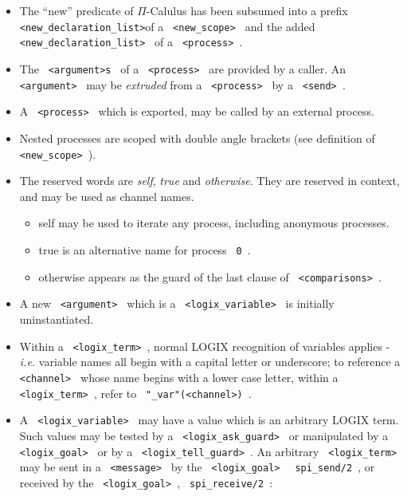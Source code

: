 \begin{itemize}

\item
The ``new'' predicate of $\Pi$-Calulus has been subsumed into a prefix
\verb+ <new_declaration_list>+\linebreak of a \verb+ <new_scope> +
and the added
\verb+ <new_declaration_list> + of a \verb+ <process> +.

\item
The \verb+ <argument>s + of a
\verb+ <process> + are provided by a caller. An \verb+ <argument> +
may be {\em extruded} from a \verb+ <process> + by a \verb+ <send> +.

\item
A \verb+ <process> + which is exported, may be called by an
external process.


\item
Nested processes are scoped with double angle brackets (see
definition of \verb+ <new_scope> +).


\item
The reserved words are {\em self}, {\em true} and {\em otherwise}.
They are reserved in context, and may be used as channel names.


\begin{itemize}
\item
self may be used to iterate any process, including anonymous processes.
\item
true is an alternative name for process \verb+ 0 +.
\item
otherwise appears as the guard of the last clause of
\verb+ <comparisons> +.
\end{itemize}

\item
A  new \verb+ <argument> + which is a \verb+ <logix_variable> + is initially
uninstantiated.

\item
Within a \verb+ <logix_term> +, normal LOGIX recognition of variables
applies - {\em i.e.} variable names all begin with a capital letter
or underscore; to reference a \verb+ <channel> + whose name begins
with a lower case letter, within a \verb+ <logix_term> +, refer to
\verb+ "_var"(<channel>) +.


\item
A \verb+ <logix_variable> + may have a value which is an arbitrary LOGIX
term.
Such values may be tested by a \verb+ <logix_ask_guard> + or manipulated
by a \verb+ <logix_goal> + or by a \verb+ <logix_tell_guard> +.  An
arbitrary  \verb+ <logix_term> + may be sent in a \verb+ <message> + by
the \verb+ <logix_goal> + \verb+ spi_send/2 +, or received by the
\verb+ <logix_goal> +, \verb+ spi_receive/2 +:


\end{itemize}
